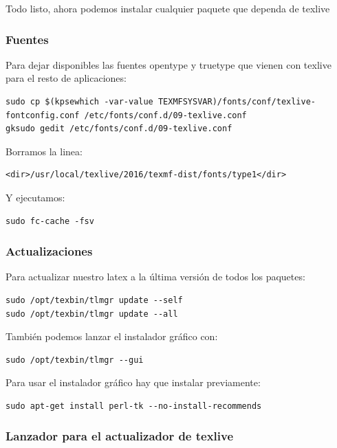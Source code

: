 \documentclass[12pt,spanish,]{scrartcl}
\begin{document}
Todo listo, ahora podemos instalar cualquier paquete que dependa de
texlive

\subsubsection{Fuentes}\label{fuentes}

Para dejar disponibles las fuentes opentype y truetype que vienen con
texlive para el resto de aplicaciones:

\begin{verbatim}
sudo cp $(kpsewhich -var-value TEXMFSYSVAR)/fonts/conf/texlive-fontconfig.conf /etc/fonts/conf.d/09-texlive.conf
gksudo gedit /etc/fonts/conf.d/09-texlive.conf
\end{verbatim}

Borramos la linea:

\begin{verbatim}
<dir>/usr/local/texlive/2016/texmf-dist/fonts/type1</dir>
\end{verbatim}

Y ejecutamos:

\begin{verbatim}
sudo fc-cache -fsv
\end{verbatim}

\subsubsection{Actualizaciones}\label{actualizaciones}

Para actualizar nuestro latex a la última versión de todos los paquetes:

\begin{verbatim}
sudo /opt/texbin/tlmgr update --self
sudo /opt/texbin/tlmgr update --all
\end{verbatim}

También podemos lanzar el instalador gráfico con:

\begin{verbatim}
sudo /opt/texbin/tlmgr --gui
\end{verbatim}

Para usar el instalador gráfico hay que instalar previamente:

\begin{verbatim}
sudo apt-get install perl-tk --no-install-recommends
\end{verbatim}

\subsubsection{Lanzador para el actualizador de
texlive}\label{lanzador-para-el-actualizador-de-texlive}
\end{document}
